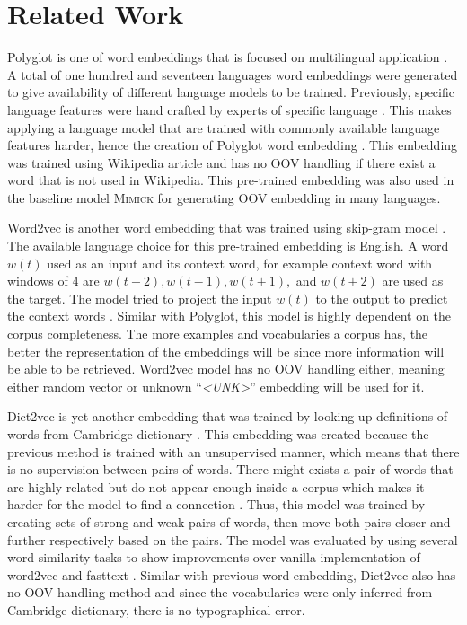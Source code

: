 \chapter{Related Work}
\label{chap:relatedwork}

Polyglot is one of word embeddings that is focused on multilingual
application \citep{polyglot2013alrfou}. A total of one hundred and
seventeen languages word embeddings were generated to give
availability of different language models to be trained. Previously,
specific language features were hand crafted by experts of specific
language \citep{polyglot2013alrfou}. This makes applying a language
model that are trained with commonly available language features
harder, hence the creation of Polyglot word embedding
\citep{polyglot2013alrfou}. This embedding was trained using Wikipedia
article and has no OOV handling if there exist a word that is not used
in Wikipedia. This pre-trained embedding was also used in the baseline
model \textsc{Mimick} for generating OOV embedding in many languages.

Word2vec is another word embedding that was trained using skip-gram
model \citep{efficient2013mikolov}. The available language choice for
this pre-trained embedding is English. A word $w(t)$ used as an input
and its context word, for example context word with windows of 4 are
$w(t-2), w(t-1), w(t+1),$ and $w(t+2)$ are used as the target. The model
tried to project the input $w(t)$ to the output to predict the context
words \citep{efficient2013mikolov}. Similar with Polyglot, this model
is highly dependent on the corpus completeness. The more examples and
vocabularies a corpus has, the better the representation of the
embeddings will be since more information will be able to be retrieved.
Word2vec model has no OOV handling either, meaning either random
vector or unknown ``\textit{\textless UNK\textgreater}'' embedding
will be used for it.

Dict2vec is yet another embedding that was trained by looking up
definitions of words from Cambridge dictionary
\citep{tissier2017dict2vec}. This embedding was created because the
previous method is trained with an unsupervised manner, which means that
there is no supervision between pairs of words. There might exists
a pair of words that are highly related but do not appear enough
inside a corpus which makes it harder for the model to find a connection
\citep{tissier2017dict2vec}. Thus, this model was trained by creating
sets of strong and weak pairs of words, then move both pairs closer
and further respectively based on the pairs. The model was evaluated by
using several word similarity tasks to show improvements over vanilla
implementation of word2vec and fasttext \citep{tissier2017dict2vec}.
Similar with previous word embedding, Dict2vec also has no OOV
handling method and since the vocabularies were only inferred from
Cambridge dictionary, there is no typographical error.

